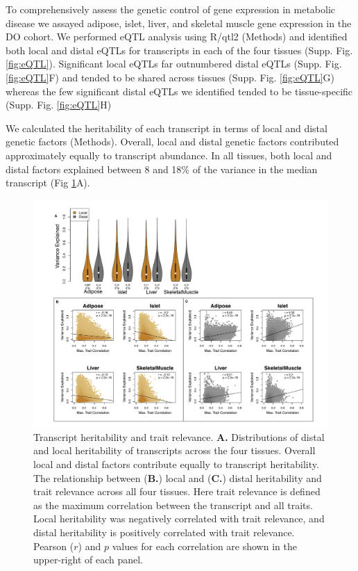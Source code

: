 \documentclass[
]{article}
\begin{document}
To comprehensively assess the genetic control of gene expression in
metabolic disease we assayed adipose, islet, liver, and skeletal muscle
gene expression in the DO cohort. We performed eQTL analysis using
R/qtl2 \cite{pmid30591514} (Methods) and identified both local and
distal eQTLs for transcripts in each of the four tissues (Supp. Fig.
\ref{fig:eQTL}). Significant local eQTLs far outnumbered distal eQTLs
(Supp. Fig. \ref{fig:eQTL}F) and tended to be shared across tissues
(Supp. Fig. \ref{fig:eQTL}G) whereas the few significant distal eQTLs we
identified tended to be tissue-specific (Supp. Fig. \ref{fig:eQTL}H)

We calculated the heritability of each transcript in terms of local and
distal genetic factors (Methods). Overall, local and distal genetic
factors contributed approximately equally to transcript abundance. In
all tissues, both local and distal factors explained between 8 and 18\%
of the variance in the median transcript (Fig \ref{fig:motivation}A).

\begin{figure}[ht!]
\includegraphics[width=\textwidth]{Figures/Fig2_motivation.pdf} 
\caption{Transcript heritability and trait relevance. 
\textbf{A.} Distributions of distal and local heritability of 
transcripts across the four tissues. Overall local and distal 
factors contribute equally to transcript heritability. The 
relationship between (\textbf{B.}) local and (\textbf{C.}) 
distal heritability and trait relevance across all four tissues. 
Here trait relevance is defined as the maximum correlation between 
the transcript and all traits. Local heritability was negatively 
correlated with trait relevance, and distal heritability is 
positively correlated with trait relevance. Pearson ($r$) and $p$ 
values for each correlation are shown in the upper-right of each panel.}
\label{fig:motivation}
\end{figure}
\end{document}
